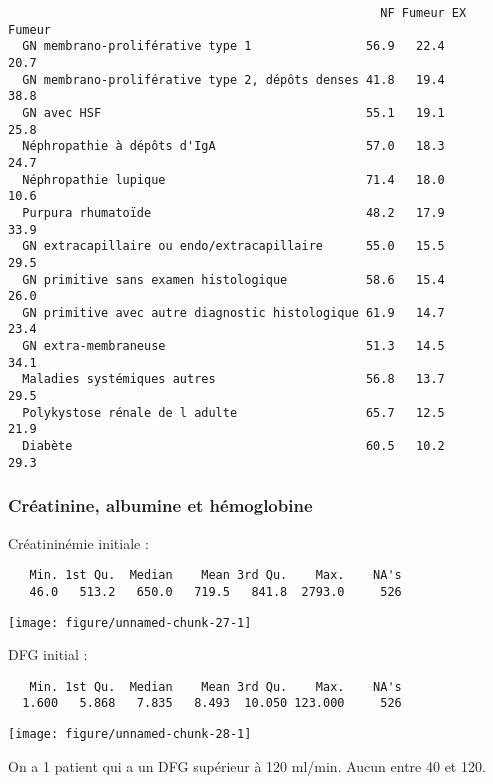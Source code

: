 \documentclass[11pt,a4paper]{article}\usepackage[]{graphicx}\usepackage[]{color}
\makeatletter
\def\maxwidth{ %
  \ifdim\Gin@nat@width>\linewidth
    \linewidth
  \else
    \Gin@nat@width
  \fi
}
\newenvironment{kframe}{%
 \def\at@end@of@kframe{}%
 \ifinner\ifhmode%
  \def\at@end@of@kframe{\end{minipage}}%
  \begin{minipage}{\columnwidth}%
 \fi\fi%
 \def\FrameCommand##1{\hskip\@totalleftmargin \hskip-\fboxsep
 \colorbox{shadecolor}{##1}\hskip-\fboxsep
     \hskip-\linewidth \hskip-\@totalleftmargin \hskip\columnwidth}%
 \MakeFramed {\advance\hsize-\width
   \@totalleftmargin\z@ \linewidth\hsize
   \@setminipage}}%
 {\par\unskip\endMakeFramed%
 \at@end@of@kframe}
\newenvironment{knitrout}{}{} %
\makeatother
\begin{document}
\begin{knitrout}
\begin{kframe}
\begin{verbatim}
                                                    NF Fumeur EX Fumeur
  GN membrano-proliférative type 1                56.9   22.4      20.7
  GN membrano-proliférative type 2, dépôts denses 41.8   19.4      38.8
  GN avec HSF                                     55.1   19.1      25.8
  Néphropathie à dépôts d'IgA                     57.0   18.3      24.7
  Néphropathie lupique                            71.4   18.0      10.6
  Purpura rhumatoïde                              48.2   17.9      33.9
  GN extracapillaire ou endo/extracapillaire      55.0   15.5      29.5
  GN primitive sans examen histologique           58.6   15.4      26.0
  GN primitive avec autre diagnostic histologique 61.9   14.7      23.4
  GN extra-membraneuse                            51.3   14.5      34.1
  Maladies systémiques autres                     56.8   13.7      29.5
  Polykystose rénale de l adulte                  65.7   12.5      21.9
  Diabète                                         60.5   10.2      29.3
\end{verbatim}
\end{kframe}
\end{knitrout}

    \subsubsection{Créatinine, albumine et hémoglobine}

Créatininémie initiale :

\begin{knitrout}
\color{fgcolor}\begin{kframe}
\begin{verbatim}
   Min. 1st Qu.  Median    Mean 3rd Qu.    Max.    NA's 
   46.0   513.2   650.0   719.5   841.8  2793.0     526 
\end{verbatim}
\end{kframe}
\texttt{[image: figure/unnamed-chunk-27-1]} 

\end{knitrout}

DFG initial :


\begin{knitrout}
\color{fgcolor}\begin{kframe}
\begin{verbatim}
   Min. 1st Qu.  Median    Mean 3rd Qu.    Max.    NA's 
  1.600   5.868   7.835   8.493  10.050 123.000     526 
\end{verbatim}
\end{kframe}
\texttt{[image: figure/unnamed-chunk-28-1]} 

\end{knitrout}
On a 1 patient qui a un DFG supérieur à 120 ml/min. Aucun entre 40 et 120.
\end{document}
